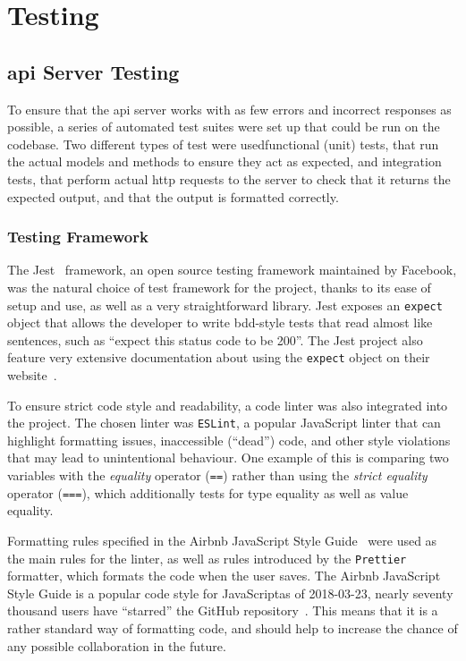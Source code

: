\chapter{Testing}

\section{\acrshort{api} Server Testing}

To ensure that the \acrshort{api} server works with as few errors and
incorrect responses as possible, a series of automated test suites were set
up that could be run on the codebase. Two different types of test were
used\textemdash{}functional (unit) tests, that run the actual models and
methods to ensure they act as expected, and integration tests, that perform
actual \acrshort{http} requests to the server to check that it returns the
expected output, and that the output is formatted correctly.

\subsection{Testing Framework}
The Jest~\cite{jest} framework, an open source testing framework maintained
by Facebook, was the natural choice of test framework for the project, thanks
to its ease of setup and use, as well as a very straightforward library. Jest
exposes an \texttt{expect} object that allows the developer to write
\acrfull{bdd}-style tests that read almost like sentences, such as ``expect
this status code to be 200''. The Jest project also feature very extensive
documentation about using the \texttt{expect} object on their
website~\cite{jest-expect}.

To ensure strict code style and readability, a code linter was also
integrated into the project. The chosen linter was \texttt{ESLint}, a popular
JavaScript linter that can highlight formatting issues, inaccessible
(``dead'') code, and other style violations that may lead to unintentional
behaviour. One example of this is comparing two variables with the
\textit{equality} operator (\texttt{==}) rather than using the \textit{strict
equality} operator (\texttt{===}), which additionally tests for type equality
as well as value equality.

Formatting rules specified in the Airbnb JavaScript Style
Guide~\cite{airbnb-javascript} were used as the main rules for the linter, as
well as rules introduced by the \texttt{Prettier} formatter, which formats
the code when the user saves. The Airbnb JavaScript Style Guide is a popular
code style for JavaScript\textemdash{}as of 2018-03-23, nearly seventy
thousand users have ``starred'' the GitHub
repository~\cite{airbnb-javascript}. This means that it is a rather standard
way of formatting code, and should help to increase the chance of any
possible collaboration in the future.

